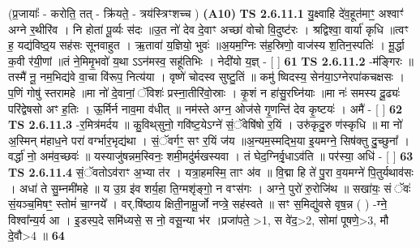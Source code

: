 \documentclass[17pt]{extarticle}
\begin{document}
                  \newline
                      (प्र॒जायाः᳚ - करोति॒ तत् - क्रि॑यते॒ - त्रय॑स्त्रिꣳशच्च )  \textbf{(A10)} \newline \newline
                                        \textbf{ TS 2.6.11.1} \newline
                  यु॒क्ष्वाहि दे॑व॒हूत॑माꣳ॒॒ अश्वाꣳ॑ अग्ने र॒थीरि॑व । नि होता॑ पू॒र्व्यः स॑दः ॥उ॒त नो॑ देव दे॒वाꣳ अच्छा॑ वोचो वि॒दुष्ट॑रः । श्रद्विश्वा॒ वार्या॑ कृधि ॥त्वꣳ ह॒ यद्य॑विष्ठ्॒य सह॑सः सूनवाहुत । ऋ॒तावा॑ य॒ज्ञियो॒ भुवः॑ ॥अ॒यम॒ग्निः स॑ह॒स्रिणो॒ वाज॑स्य श॒तिन॒स्पतिः॑ । मू॒र्द्धा क॒वी र॑यी॒णां ॥तं ने॒मिमृ॒भवो॑ य॒था ऽऽन॑मस्व॒ सहू॑तिभिः । नेदी॑यो य॒ज्ञ् - [  ] \textbf{  61} \newline
                  \newline
                                \textbf{ TS 2.6.11.2} \newline
                  -म॑ङ्गिरः ॥ तस्मै॑ नू॒ नम॒भिद्य॑वे वा॒चा वि॑रूप॒ नित्य॑या । वृष्णे॑ चोदस्व सुष्टु॒तिं ॥ कमु॑ ष्विदस्य॒ सेन॑या॒ऽग्नेरपा॑कचक्षसः । प॒णिं गोषु॑ स्तरामहे ॥मा नो॑ दे॒वानां॒ ॅविशः॑ प्रस्ना॒तीरि॑वो॒स्राः । कृ॒शं न हा॑सु॒रघ्नि॑याः ॥मा नः॑ समस्य दू॒ढ्यः॑ परि॑द्वेषसो अꣳ ह॒तिः । ऊ॒र्मिर्न नाव॒मा व॑धीत् ॥ नम॑स्ते अग्न॒ ओज॑से गृ॒णन्ति॑ देव कृ॒ष्टयः॑ । अमै॑ - [  ] \textbf{  62} \newline
                  \newline
                                \textbf{ TS 2.6.11.3} \newline
                  -र॒मित्र॑मर्दय ॥ कु॒विथ्‌सुनो॒ गवि॑ष्ट॒येऽग्ने॑ सं॒ॅवेषि॑षो र॒यिं । उरु॑कृदु॒रु ण॑स्कृधि ॥ मा नो॑ अ॒स्मिन् म॑हाध॒ने परा॑ वर्ग्भार॒भृद्य॑था । सं॒ॅवर्गꣳ॒॒ सꣳ र॒यिं ज॑य ॥अ॒न्यम॒स्मद्भि॒या इ॒यमग्ने॒ सिष॑क्तु दु॒च्छुना᳚ । वर्द्धा॑ नो॒ अम॑व॒च्छवः॑ ॥ यस्याजु॑षन्नम॒स्विनः॒ शमी॒मदु॑र्मखस्यवा । तं घेद॒ग्निर्वृ॒धाऽव॑ति ॥ पर॑स्या॒ अधि॑ - [  ] \textbf{  63} \newline
                  \newline
                                \textbf{ TS 2.6.11.4} \newline
                  सं॒ॅवतोऽव॑राꣳ अ॒भ्या त॑र । यत्रा॒हमस्मि॒ ताꣳ अ॑व ॥ वि॒द्मा हि ते॑ पु॒रा व॒यमग्ने॑ पि॒तुर्यथाव॑सः । अधा॑ ते सु॒म्नमी॑महे ॥ य उ॒ग्र इ॑व शर्य॒हा ति॒ग्मशृ॑ङ्गो॒ न वꣳस॑गः । अग्ने॒ पुरो॑ रु॒रोजि॑थ ॥ सखा॑यः॒ सं ॅवः॑ सं॒यञ्च॒मिषꣳ॒॒ स्तोमं॑ चा॒ग्नये᳚ । वर्.षि॑ष्ठाय क्षिती॒नामू॒र्जो नप्त्रे॒ सह॑स्वते ॥ सꣳ स॒मिद्यु॑वसे वृष॒न्न ( ) -ग्ने॒ विश्वा᳚न्य॒र्य आ । इ॒डस्प॒दे समि॑ध्यसे॒ स नो॒ वसू॒न्या भ॑र ।प्रजा॑पते॒ >1, स वे॑द॒>2, सोमा॑ पूषणे॒>3, मौ दे॒वौ>4 ॥ \textbf{  64} \newline
\end{document}
